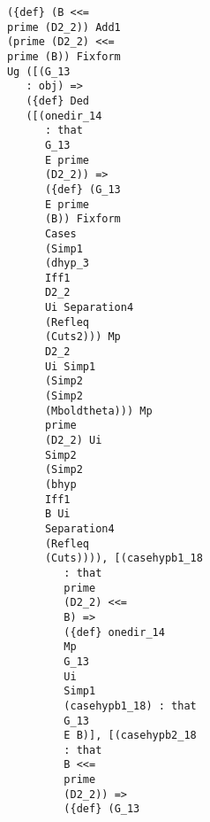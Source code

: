 \documentclass[12pt]{article}
\begin{document}
\begin{verbatim}
                               ({def} (B <<= 
                               prime (D2_2)) Add1 
                               (prime (D2_2) <<= 
                               prime (B)) Fixform 
                               Ug ([(G_13 
                                  : obj) => 
                                  ({def} Ded 
                                  ([(onedir_14 
                                     : that 
                                     G_13 
                                     E prime 
                                     (D2_2)) => 
                                     ({def} (G_13 
                                     E prime 
                                     (B)) Fixform 
                                     Cases 
                                     (Simp1 
                                     (dhyp_3 
                                     Iff1 
                                     D2_2 
                                     Ui Separation4 
                                     (Refleq 
                                     (Cuts2))) Mp 
                                     D2_2 
                                     Ui Simp1 
                                     (Simp2 
                                     (Simp2 
                                     (Mboldtheta))) Mp 
                                     prime 
                                     (D2_2) Ui 
                                     Simp2 
                                     (Simp2 
                                     (bhyp 
                                     Iff1 
                                     B Ui 
                                     Separation4 
                                     (Refleq 
                                     (Cuts)))), [(casehypb1_18 
                                        : that 
                                        prime 
                                        (D2_2) <<= 
                                        B) => 
                                        ({def} onedir_14 
                                        Mp 
                                        G_13 
                                        Ui 
                                        Simp1 
                                        (casehypb1_18) : that 
                                        G_13 
                                        E B)], [(casehypb2_18 
                                        : that 
                                        B <<= 
                                        prime 
                                        (D2_2)) => 
                                        ({def} (G_13 

\end{verbatim}
\end{document}
